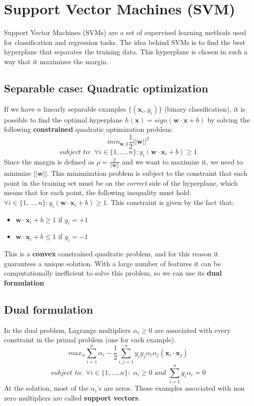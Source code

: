 \section{Support Vector Machines (SVM)}
Support Vector Machines (SVMs) are a set of supervised learning methods used for classification and regression tasks. The idea behind SVMs is to find the best hyperplane that separates the training data. This hyperplane is chosen in such a way that it maximizes the margin.
\subsection{Separable case: Quadratic optimization}
If we have $n$ linearly separable examples $\{(\textbf{x}_{i}, y_{i})\}$ (binary classification), it is possible to find the optimal hyperplane $h(\textbf{x}) = sign(\textbf{w} \cdot \textbf{x} + b)$ by solving the following \textbf{constrained} quadratic optimization problem:
\[min_{\textbf{w},b}\frac{1}{2}||\textbf{w}||^{2}\]
\[subject \,\, to: \,\, \forall i \in \{1,...,n\}: y_{i}(\textbf{w} \cdot \textbf{x}_{i} + b) \geq 1\]
Since the margin is defined as $\rho = \frac{2}{||\textbf{w}||}$ and we want to maximize it, we need to minimize $||\textbf{w}||$. This minimization problem is subject to the constraint that each point in the training set must be on the \textit{correct} side of the hyperplane, which means that for each point, the following inequality must hold: $\forall i \in \{1,...,n\}: y_{i}(\textbf{w} \cdot \textbf{x}_{i} + b) \geq 1$. This constraint is given by the fact that:
\begin{itemize}
    \item $\textbf{w} \cdot \textbf{x}_{i} + b \geq 1$ if $y_{i} = +1$
    \item $\textbf{w} \cdot \textbf{x}_{i} + b \leq 1$ if $y_{i} = -1$
\end{itemize}
This is a \textbf{convex} constrained quadratic problem, and for this reason it guarantees a unique solution.\newline\newline
With a large number of features it can be computationally inefficient to solve this problem, so we can use its \textbf{dual formulation}
\subsection{Dual formulation}
In the dual problem, Lagrange multipliers $\alpha_{i} \geq 0$ are associated with every constraint in the primal problem (one for each example).
\[max_{\alpha} \sum_{i=1}^{n}\alpha_{i} - \frac{1}{2}\sum_{i,j=1}^{n}y_{i}y_{j}\alpha_{i}\alpha_{j}(\textbf{x}_{i} \cdot \textbf{x}_{j})\]
\[subject \,\, to: \,\, \forall i \in \{1,...,n\}: \,\, \alpha_{i} \geq 0 \,\, and \,\, \sum_{i=1}^{n}y_{i}\alpha_{i} = 0\]
At the solution, most of the $\alpha_{i}$'s are zeros. Those examples associated with non zero multipliers are called \textbf{support vectors}.

